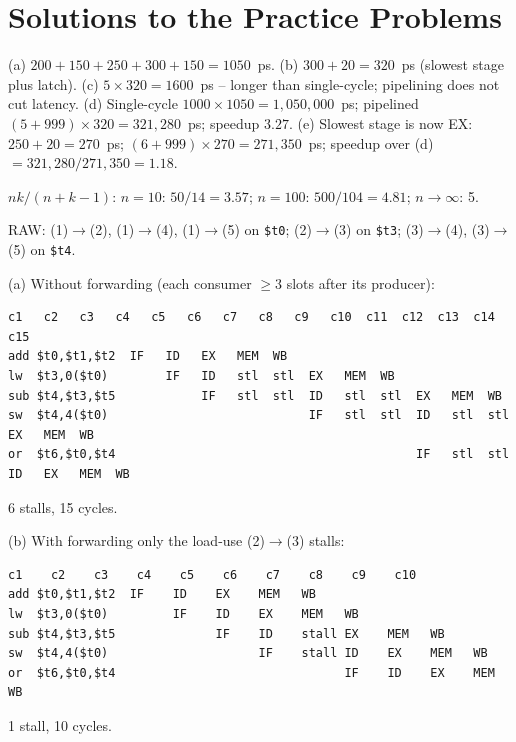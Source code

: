 \documentclass[11pt]{article}
\begin{document}
\section{Solutions to the Practice Problems}

\begin{solution}[\ref{p:clock}]
(a) $200+150+250+300+150 = 1050$~ps.
(b) $300+20 = 320$~ps (slowest stage plus latch).
(c) $5\times320 = 1600$~ps -- longer than single-cycle; pipelining does not
cut latency.
(d) Single-cycle $1000\times1050 = 1{,}050{,}000$~ps; pipelined
$(5+999)\times320 = 321{,}280$~ps; speedup $3.27$.
(e) Slowest stage is now EX: $250+20=270$~ps; $(6+999)\times270 =
271{,}350$~ps; speedup over (d) $=321{,}280/271{,}350 = 1.18$.
\end{solution}

\begin{solution}[\ref{p:ideal}]
$nk/(n+k-1)$: $n=10$: $50/14 = 3.57$; $n=100$: $500/104 = 4.81$;
$n\to\infty$: 5.
\end{solution}

\begin{solution}[\ref{p:stalls}]
RAW: (1)$\to$(2), (1)$\to$(4), (1)$\to$(5) on \texttt{\$t0};
(2)$\to$(3) on \texttt{\$t3}; (3)$\to$(4), (3)$\to$(5) on \texttt{\$t4}.

(a) Without forwarding (each consumer $\ge3$ slots after its producer):
\begin{lstlisting}[basicstyle=\ttfamily\scriptsize,keywords={}]
                 c1   c2   c3   c4   c5   c6   c7   c8   c9   c10  c11  c12  c13  c14  c15
add $t0,$t1,$t2  IF   ID   EX   MEM  WB
lw  $t3,0($t0)        IF   ID   stl  stl  EX   MEM  WB
sub $t4,$t3,$t5            IF   stl  stl  ID   stl  stl  EX   MEM  WB
sw  $t4,4($t0)                            IF   stl  stl  ID   stl  stl  EX   MEM  WB
or  $t6,$t0,$t4                                          IF   stl  stl  ID   EX   MEM  WB
\end{lstlisting}
6 stalls, 15 cycles.

(b) With forwarding only the load-use (2)$\to$(3) stalls:
\begin{lstlisting}[basicstyle=\ttfamily\footnotesize,keywords={}]
                 c1    c2    c3    c4    c5    c6    c7    c8    c9    c10
add $t0,$t1,$t2  IF    ID    EX    MEM   WB
lw  $t3,0($t0)         IF    ID    EX    MEM   WB
sub $t4,$t3,$t5              IF    ID    stall EX    MEM   WB
sw  $t4,4($t0)                     IF    stall ID    EX    MEM   WB
or  $t6,$t0,$t4                                IF    ID    EX    MEM   WB
\end{lstlisting}
1 stall, 10 cycles.
\end{solution}
\end{document}
